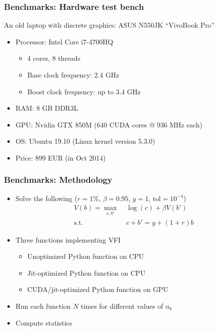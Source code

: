 \documentclass[10pt, aspectratio=1610]{beamer}
\begin{document}
\begin{frame}
  \frametitle{Benchmarks: Hardware test bench}

  An old laptop with discrete graphics: ASUS N550JK ``VivoBook Pro''

  \begin{itemize}
    \item Processor: Intel Core i7-4700HQ
      \begin{itemize}
        \item 4 cores, 8 threads
        \item Base clock frequency: 2.4 GHz
        \item Boost clock frequency: up to 3.4 GHz
      \end{itemize}
    \item RAM: 8 GB DDR3L
    \item GPU: Nvidia GTX 850M (640 CUDA cores @ 936 MHz each)
    \item OS: Ubuntu 19.10 (Linux kernel version 5.3.0)
    \item Price: 899 EUR (in Oct 2014)
  \end{itemize}

\end{frame}

\begin{frame}
  \frametitle{Benchmarks: Methodology}

  \begin{itemize}
    \item Solve the following ($r=1\%$, $\beta=0.95$, $y=1$, $\text{tol}=10^{-4}$)
      \begin{align*}
        V(b) = \max_{c, b'} &\; \log(c) + \beta V(b') \\
        \text{s.t.} &\; c + b' = y + (1+r) b
      \end{align*}

    \vfill
    \item Three functions implementing VFI
      \begin{itemize}
        \item Unoptimized Python function on CPU
        \item Jit-optimized Python function on CPU
        \item CUDA/jit-optimized Python function on GPU
      \end{itemize}
    \item Run each function $N$ times for different values of $n_b$
    \item Compute statistics
  \end{itemize}

\end{frame}
\end{document}
